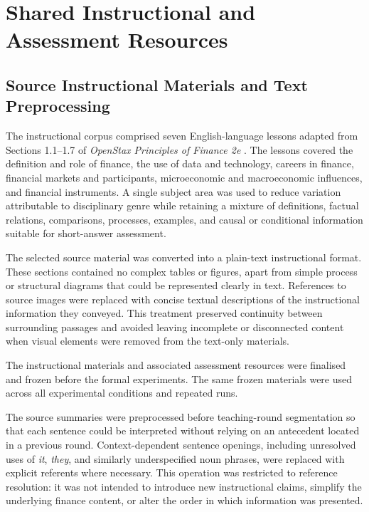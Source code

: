 \section{Shared Instructional and Assessment Resources}
\label{sec:teaching-materials-dataset}

\subsection{Source Instructional Materials and Text Preprocessing}
\label{subsec:source-materials}

The instructional corpus comprised seven English-language lessons adapted from Sections 1.1--1.7 of \textit{OpenStax Principles of Finance 2e} \cite{dahlquist2026principlesfinance2e}. The lessons covered the definition and role of finance, the use of data and technology, careers in finance, financial markets and participants, microeconomic and macroeconomic influences, and financial instruments. A single subject area was used to reduce variation attributable to disciplinary genre while retaining a mixture of definitions, factual relations, comparisons, processes, examples, and causal or conditional information suitable for short-answer assessment.

The selected source material was converted into a plain-text instructional format. These sections contained no complex tables or figures, apart from simple process or structural diagrams that could be represented clearly in text. References to source images were replaced with concise textual descriptions of the instructional information they conveyed. This treatment preserved continuity between surrounding passages and avoided leaving incomplete or disconnected content when visual elements were removed from the text-only materials.

The instructional materials and associated assessment resources were finalised and frozen before the formal experiments. The same frozen materials were used across all experimental conditions and repeated runs.

The source summaries were preprocessed before teaching-round segmentation so that each sentence could be interpreted without relying on an antecedent located in a previous round. Context-dependent sentence openings, including unresolved uses of \textit{it}, \textit{they}, and similarly underspecified noun phrases, were replaced with explicit referents where necessary. This operation was restricted to reference resolution: it was not intended to introduce new instructional claims, simplify the underlying finance content, or alter the order in which information was presented.

